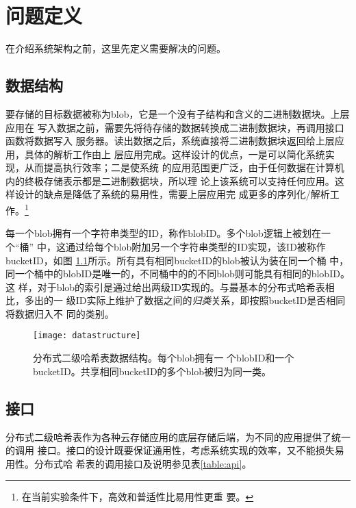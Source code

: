 \chapter{问题定义}\label{chapter:def}
在介绍系统架构之前，这里先定义需要解决的问题。

\section{数据结构}
要存储的目标数据被称为blob，它是一个没有子结构和含义的二进制数据块。上层应用在
写入数据之前，需要先将待存储的数据转换成二进制数据块，再调用接口函数将数据写入
服务器。读出数据之后，系统直接将二进制数据块返回给上层应用，具体的解析工作由上
层应用完成。这样设计的优点，一是可以简化系统实现，从而提高执行效率；二是使系统
的应用范围更广泛，由于任何数据在计算机内的终极存储表示都是二进制数据块，所以理
论上该系统可以支持任何应用。这样设计的缺点是降低了系统的易用性，需要上层应用完
成更多的序列化/解析工作。\footnote{在当前实验条件下，高效和普适性比易用性更重
要。}

每一个blob拥有一个字符串类型的ID，称作blobID。多个blob逻辑上被划在一个``桶''
中，这通过给每个blob附加另一个字符串类型的ID实现，该ID被称作bucketID，如图
\ref{figure:datastructure}所示。所有具有相同bucketID的blob被认为装在同一个桶
中，同一个桶中的blobID是唯一的，不同桶中的的不同blob则可能具有相同的blobID。这
样，对于blob的索引是通过给出两级ID实现的。与最基本的分布式哈希表相比，多出的一
级ID实际上维护了数据之间的\emph{归类}关系，即按照bucketID是否相同将数据归入不
同的类别。

\begin{figure}[htb]
  \centering
  \texttt{[image: datastructure]}
  \caption[分布式二级哈希表数据结构]{分布式二级哈希表数据结构。每个blob拥有一
  个blobID和一个bucketID。共享相同bucketID的多个blob被归为同一类。}
  \label{figure:datastructure}
\end{figure}

\section{接口}\label{section:api}
分布式二级哈希表作为各种云存储应用的底层存储后端，为不同的应用提供了统一的调用
接口。接口的设计既要保证通用性，考虑系统实现的效率，又不能损失易用性。分布式哈
希表的调用接口及说明参见表\ref{table:api}。

